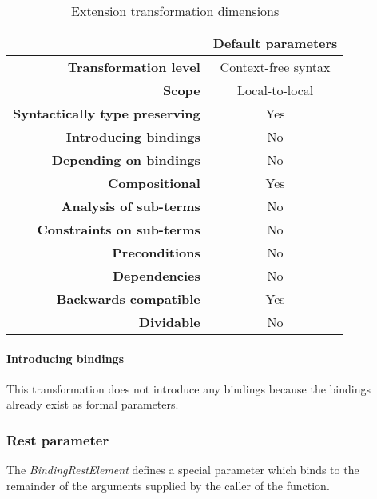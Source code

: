 \documentclass[10pt,a4paper]{article}
\begin{document}
\begin{table}[H]
\centering
\caption{Extension transformation dimensions}
\label{default-parameter-table}
\begin{tabular}{@{}rc@{}}
\toprule
                                       & \multicolumn{1}{l}{\textbf{Default parameters}} \\ \midrule
\textbf{Transformation level}          & Context-free syntax                          \\
\textbf{Scope}                         & Local-to-local                               \\
\textbf{Syntactically type preserving} & Yes                                          \\
\textbf{Introducing bindings}          & No                                          \\%
\textbf{Depending on bindings}         & No                                           \\
\textbf{Compositional}                 & Yes                                          \\
\textbf{Analysis of sub-terms}          & No                                          \\
\textbf{Constraints on sub-terms}       & No                                           \\
\textbf{Preconditions}                 & No                                          \\
\textbf{Dependencies}                  & No                                           \\
\textbf{Backwards compatible}          & Yes                                          \\
\textbf{Dividable}                     & No                                           \\ \bottomrule
\end{tabular}
\end{table}

\paragraph{Introducing bindings}
This transformation does not introduce any bindings because the bindings already exist as formal parameters.

\subsubsection{Rest parameter}
The \textit{BindingRestElement} defines a special parameter which binds to the remainder of the arguments supplied by the caller of the function.\cite[14.1]{SpecJS}
\end{document}
